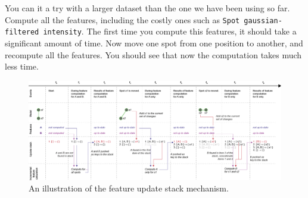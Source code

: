 You can it a try with a larger dataset than the one we have been using so far.
Compute all the features, including the costly ones such as \texttt{Spot gaussian-filtered intensity}.
The first time you compute this features, it should take a significant amount of time.
Now move one spot from one position to another, and recompute all the features. 
You should see that now the computation takes much less time.

\begin{figure}
    \centering
    \includegraphics[angle=90, height=0.8\textheight]{figures/Mastodon_FeatureUpdateStack.png}
    \caption{An illustration of the feature update stack mechanism.  }
    \label{fig:FeatureUpdateStack}
\end{figure}
